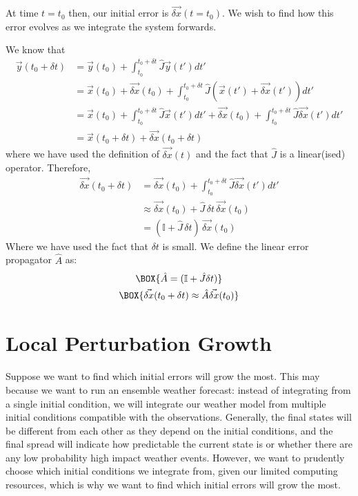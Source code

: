 At time $t=t_0$ then, our initial error is $\vec{\delta x}(t=t_0)$. We wish to find how this error evolves as we integrate the system forwards.

We know that
\begin{align*}
    \vec{y}(t_0+\delta t) & = \vec{y}(t_0) + \int_{t_0}^{t_0+\delta t} \hat{J} \vec{y}(t') dt'\\
    & = \vec{x}(t_0) + \vec{\delta x}(t_0)+ \int_{t_0}^{t_0+\delta t} \hat{J} (\vec{x}(t') + \vec{\delta x}(t')) dt'\\
    & = \vec{x}(t_0) + \int_{t_0}^{t_0+\delta t} \hat{J} \vec{x}(t') dt'+ \vec{\delta x}(t_0)+ \int_{t_0}^{t_0+\delta t} \hat{J} \vec{\delta x}(t') dt'\\
    & = \vec{x}(t_0+\delta t) + \vec{\delta x}(t_0+\delta t)
\end{align*}
where we have used the definition of $\vec{\delta x}(t)$ and the fact that $\hat{J}$ is a linear(ised) operator. Therefore, 
\begin{align*}
    \vec{\delta x}(t_0+\delta t) & = \vec{\delta x}(t_0)+ \int_{t_0}^{t_0+\delta t} \hat{J} \vec{\delta x}(t') dt'\\
    & \approx \vec{\delta x}(t_0)+ \hat{J} \,\delta t\,\vec{\delta x}(t_0)
    \\
    & = (\mathbb{I} + \hat{J}\,\delta t)\,\vec{\delta x}(t_0)
\end{align*}
Where we have used the fact that $\delta t$ is small. We define the linear error propagator $\hat{A}$ as:
\begin{gather}
    \BOX{\hat{A} = (\mathbb{I} + \hat{J}\delta t)}
    \\
    \BOX{\vec{\delta x}(t_0+\delta t)\approx\hat{A}\vec{\delta x}(t_0)} \label{dx}
\end{gather}

\section{Local Perturbation Growth}

Suppose we want to find which initial errors will grow the most. This may because we want to run an ensemble weather forecast: instead of integrating from a single initial condition, we will integrate our weather model from multiple initial conditions compatible with the observations. Generally, the final states will be different from each other as they depend on the initial conditions, and the final spread will indicate how predictable the current state is or whether there are any low probability high impact weather events. However, we want to prudently choose which initial conditions we integrate from, given our limited computing resources, which is why we want to find which initial errors will grow the most.

